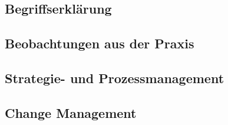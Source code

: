\documentclass{article}
\begin{document}
  \subsection{Begriffserklärung}
  \subsection{Beobachtungen aus der Praxis}
  \subsection{Strategie- und Prozessmanagement}
  \subsection{Change Management}























  
\end{document}
